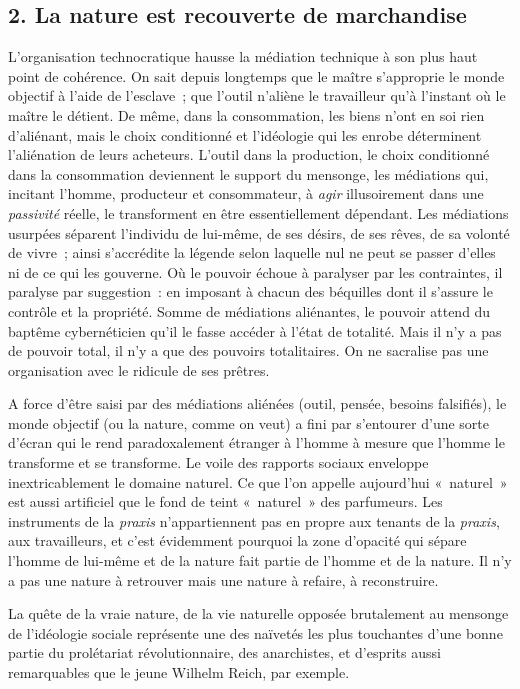 \documentclass[french,twoside]{book} %
\begin{document}
\subsection[{2. La nature est recouverte de marchandise}]{\textsc{2.} La nature est recouverte de marchandise}
\noindent L’organisation technocratique hausse la médiation technique à son plus haut point de cohérence. On sait depuis longtemps que le maître s’approprie le monde objectif à l’aide de l’esclave ; que l’outil n’aliène le travailleur qu’à l’instant où le maître le détient. De même, dans la consommation, les biens n’ont en soi rien d’aliénant, mais le choix conditionné et l’idéologie qui les enrobe déterminent l’aliénation de leurs acheteurs. L’outil dans la production, le choix conditionné dans la consommation deviennent le support du mensonge, les médiations qui, incitant l’homme, producteur et consommateur, à \emph{agir} illusoirement dans une \emph{passivité} réelle, le transforment en être essentiellement dépendant. Les médiations usurpées séparent l’individu de lui-même, de ses désirs, de ses rêves, de sa volonté de vivre ; ainsi s’accrédite la légende selon laquelle nul ne peut se passer d’elles ni de ce qui les gouverne. Où le pouvoir échoue à paralyser par les contraintes, il paralyse par suggestion : en imposant à chacun des béquilles dont il s’assure le contrôle et la propriété. Somme de médiations aliénantes, le pouvoir attend du baptême cybernéticien qu’il le fasse accéder à l’état de totalité. Mais il n’y a pas de pouvoir total, il n’y a que des pouvoirs totalitaires. On ne sacralise pas une organisation avec le ridicule de ses prêtres.\par
A force d’être saisi par des médiations aliénées (outil, pensée, besoins falsifiés), le monde objectif (ou la nature, comme on veut) a fini par s’entourer d’une sorte d’écran qui le rend paradoxalement étranger à l’homme à mesure que l’homme le transforme et se transforme. Le voile des rapports sociaux enveloppe inextricablement le domaine naturel. Ce que l’on appelle aujourd’hui « naturel » est aussi artificiel que le fond de teint « naturel » des parfumeurs. Les instruments de la \emph{praxis} n’appartiennent pas en propre aux tenants de la \emph{praxis}, aux travailleurs, et c’est évidemment pourquoi la zone d’opacité qui sépare l’homme de lui-même et de la nature fait partie de l’homme et de la nature. Il n’y a pas une nature à retrouver mais une nature à refaire, à reconstruire.\par
La quête de la vraie nature, de la vie naturelle opposée brutalement au mensonge de l’idéologie sociale représente une des naïvetés les plus touchantes d’une bonne partie du prolétariat révolutionnaire, des anarchistes, et d’esprits aussi remarquables que le jeune Wilhelm Reich, par exemple.\par
\end{document}
